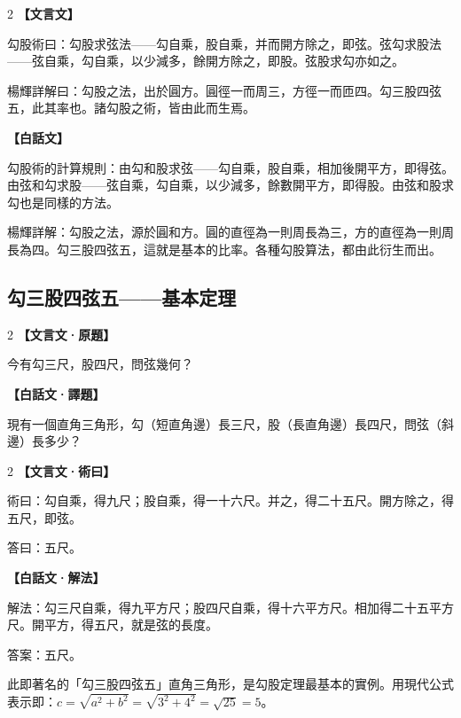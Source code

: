 \documentclass[11pt,a4paper]{article}
\newcommand{\zhc}{}[1]{{\CJKfamily{\CJKrmdefault}#1}}  %
\newcommand{\zhm}[1]{{\CJKfamily{\CJKrmdefault}#1}}  %
\newenvironment{prob bilingual}[1][]{%
  \begin{paracol}{2}%
  \setlength{\columnseprule}{0.4pt}%
}{%
  \end{paracol}%
  \medskip%
}
\begin{document}
\begin{paracol}{2}
\switchcolumn[0]
\noindent\textbf{\textcolor{notecolor}{\zhc{【文言文】}}}\par\smallskip
\zhc{
勾股術曰：勾股求弦法——勾自乘，股自乘，并而開方除之，即弦。弦勾求股法——弦自乘，勾自乘，以少減多，餘開方除之，即股。弦股求勾亦如之。

楊輝詳解曰：勾股之法，出於圓方。圓徑一而周三，方徑一而匝四。勾三股四弦五，此其率也。諸勾股之術，皆由此而生焉。
}

\switchcolumn[1]
\noindent\textbf{\textcolor{notecolor}{\zhm{【白話文】}}}\par\smallskip
\zhm{
勾股術的計算規則：由勾和股求弦——勾自乘，股自乘，相加後開平方，即得弦。由弦和勾求股——弦自乘，勾自乘，以少減多，餘數開平方，即得股。由弦和股求勾也是同樣的方法。

楊輝詳解：勾股之法，源於圓和方。圓的直徑為一則周長為三，方的直徑為一則周長為四。勾三股四弦五，這就是基本的比率。各種勾股算法，都由此衍生而出。
}
\end{paracol}

\vspace{0.5cm}

\subsection{\zhc{勾三股四弦五——基本定理}}

\begin{paracol}{2}
\switchcolumn[0]
\noindent\textbf{\textcolor{notecolor}{\zhc{【文言文·原題】}}}\par\smallskip
\zhc{
今有勾三尺，股四尺，問弦幾何？
}

\switchcolumn[1]
\noindent\textbf{\textcolor{notecolor}{\zhm{【白話文·譯題】}}}\par\smallskip
\zhm{
現有一個直角三角形，勾（短直角邊）長三尺，股（長直角邊）長四尺，問弦（斜邊）長多少？
}
\end{paracol}

\medskip

\begin{paracol}{2}
\switchcolumn[0]
\noindent\textbf{\textcolor{notecolor}{\zhc{【文言文·術曰】}}}\par\smallskip
\zhc{
術曰：勾自乘，得九尺；股自乘，得一十六尺。并之，得二十五尺。開方除之，得五尺，即弦。

答曰：五尺。
}

\switchcolumn[1]
\noindent\textbf{\textcolor{notecolor}{\zhm{【白話文·解法】}}}\par\smallskip
\zhm{
解法：勾三尺自乘，得九平方尺；股四尺自乘，得十六平方尺。相加得二十五平方尺。開平方，得五尺，就是弦的長度。

答案：五尺。

此即著名的「勾三股四弦五」直角三角形，是勾股定理最基本的實例。用現代公式表示即：$c = \sqrt{a^2 + b^2} = \sqrt{3^2 + 4^2} = \sqrt{25} = 5$。
}
\end{paracol}
\end{document}
